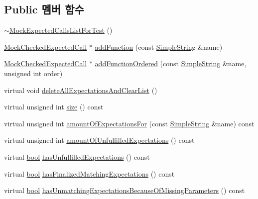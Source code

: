 \subsection*{Public 멤버 함수}
\begin{DoxyCompactItemize}
\item 
\hyperlink{class_mock_expected_calls_list_for_test_abf271956518354e1865235c2753337ef}{$\sim$\+Mock\+Expected\+Calls\+List\+For\+Test} ()
\item 
\hyperlink{class_mock_checked_expected_call}{Mock\+Checked\+Expected\+Call} $\ast$ \hyperlink{class_mock_expected_calls_list_for_test_a7e10e8373d87ec69119e517e8e84cc9f}{add\+Function} (const \hyperlink{class_simple_string}{Simple\+String} \&name)
\item 
\hyperlink{class_mock_checked_expected_call}{Mock\+Checked\+Expected\+Call} $\ast$ \hyperlink{class_mock_expected_calls_list_for_test_af356afb9633ad30e4d49f26df7dfd454}{add\+Function\+Ordered} (const \hyperlink{class_simple_string}{Simple\+String} \&name, unsigned int order)
\item 
virtual void \hyperlink{class_mock_expected_calls_list_a1b991fee7b48dd24016188748b8c3b8d}{delete\+All\+Expectations\+And\+Clear\+List} ()
\item 
virtual unsigned int \hyperlink{class_mock_expected_calls_list_a90ca964ebcc1b02bbcde225edd49e812}{size} () const 
\item 
virtual unsigned int \hyperlink{class_mock_expected_calls_list_abccf9d0c2774fe798d64b1431b77e44a}{amount\+Of\+Expectations\+For} (const \hyperlink{class_simple_string}{Simple\+String} \&name) const 
\item 
virtual unsigned int \hyperlink{class_mock_expected_calls_list_aff4f9afb8dd7147c1fe467782e316757}{amount\+Of\+Unfulfilled\+Expectations} () const 
\item 
virtual \hyperlink{avb__gptp_8h_af6a258d8f3ee5206d682d799316314b1}{bool} \hyperlink{class_mock_expected_calls_list_a253f89ba986cb5c3db1c213f90806fbe}{has\+Unfulfilled\+Expectations} () const 
\item 
virtual \hyperlink{avb__gptp_8h_af6a258d8f3ee5206d682d799316314b1}{bool} \hyperlink{class_mock_expected_calls_list_aaf2a3bc73b6efb9e1971abf8981a1414}{has\+Finalized\+Matching\+Expectations} () const 
\item 
virtual \hyperlink{avb__gptp_8h_af6a258d8f3ee5206d682d799316314b1}{bool} \hyperlink{class_mock_expected_calls_list_aeed6547f5817eb530c06ddbfb2ea4103}{has\+Unmatching\+Expectations\+Because\+Of\+Missing\+Parameters} () const 

\end{DoxyCompactItemize}
